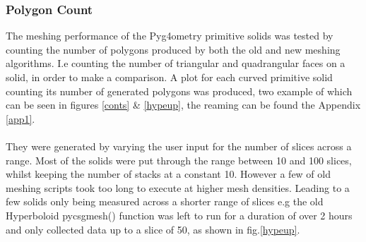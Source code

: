\documentclass[12pt,a4paper]{article}
\begin{document}
\subsubsection{Polygon Count}
The meshing performance of the Pyg4ometry primitive solids was tested by counting the number of polygons produced by both the old and new meshing algorithms. I.e counting the number of triangular and quadrangular faces on a solid, in order to make a comparison. A plot for each curved primitive solid counting its number of generated polygons was produced, two example of which can be seen in figures \ref{conts} \& \ref{hypeup}, the reaming can be found the Appendix \ref{app1}.
\\\\
They were generated by varying the user input for the number of slices across a range. Most of the solids were put through the range between 10 and 100 slices, whilst keeping the number of stacks at a constant 10. However a few of old meshing scripts took too long to execute at higher mesh densities. Leading to a few solids only being measured across a shorter range of slices e.g the old Hyperboloid pycsgmesh() function was left to run for a duration of over 2 hours and only collected data up to a slice of 50, as shown in fig.\ref{hypeup}.  \\
\end{document}
